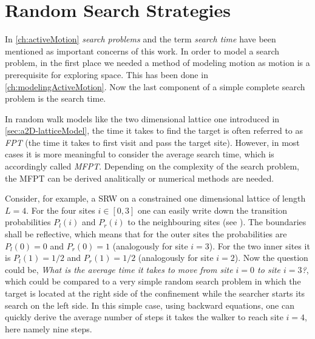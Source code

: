\chapter{Random Search Strategies}\label{ch:randomSearchStrategies}
In \autoref{ch:activeMotion} \emph{search problems} and the term \emph{search time} have been mentioned as important concerns of this work. In order to model a search problem, in the first place we needed a method of modeling motion as motion is a prerequisite for exploring space. This has been done in \autoref{ch:modelingActiveMotion}. Now the last component of a simple complete search problem is the search time.

In random walk models like the two dimensional lattice one introduced in \autoref{sec:a2D-latticeModel}, the time it takes to find the target is often referred to as \textit{\ac{FPT}} (the time it takes to first visit and pass the target site). However, in most cases it is more meaningful to consider the average search time, which is accordingly called \textit{\ac{MFPT}}. Depending on the complexity of the search problem, the \acs{MFPT} can be derived analitically or numerical methods are needed.

Consider, for example, a \acs{SRW} on a constrained one dimensional lattice of length $L=4$. For the four sites $i\in\left[0,3\right]$ one can easily write down the transition probabilities $P_l\left(i\right)$ and $P_r\left(i\right)$ to the neighbouring sites (see ). The boundaries shall be reflective, which means that for the outer sites the probabilities are  $P_l\left(0\right)=0$ and $P_r\left(0\right)=1$ (analogously for site $i=3$). For the two inner sites it is $P_l\left(1\right)=1/2$ and $P_r\left(1\right)=1/2$ (analogously for site $i=2$). Now the question could be, \emph{What is the average time it takes to move from site $i=0$ to site $i=3$?}, which could be compared to a very simple random search problem in which the target is located at the right side of the confinement while the searcher starts its search on the left side. In this simple case, using backward equations, one can quickly derive the average number of steps it takes the walker to reach site $i=4$, here namely nine steps.


